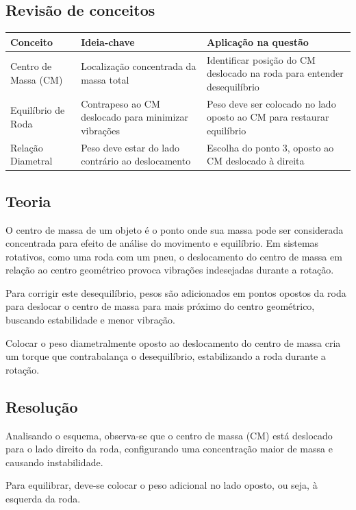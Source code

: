 \documentclass{article}
\begin{document}
\subsection*{Revisão de conceitos}
\begin{tabular}{|p{4cm}|p{5cm}|p{5cm}|}
\hline
\textbf{Conceito} & \textbf{Ideia-chave} & \textbf{Aplicação na questão} \\
\hline
Centro de Massa (CM) & Localização concentrada da massa total & Identificar posição do CM deslocado na roda para entender desequilíbrio \\
\hline
Equilíbrio de Roda & Contrapeso ao CM deslocado para minimizar vibrações & Peso deve ser colocado no lado oposto ao CM para restaurar equilíbrio \\
\hline
Relação Diametral & Peso deve estar do lado contrário ao deslocamento & Escolha do ponto 3, oposto ao CM deslocado à direita \\
\hline
\end{tabular}

\subsection*{Teoria}

O centro de massa de um objeto é o ponto onde sua massa pode ser considerada concentrada para efeito de análise do movimento e equilíbrio. Em sistemas rotativos, como uma roda com um pneu, o deslocamento do centro de massa em relação ao centro geométrico provoca vibrações indesejadas durante a rotação.

Para corrigir este desequilíbrio, pesos são adicionados em pontos opostos da roda para deslocar o centro de massa para mais próximo do centro geométrico, buscando estabilidade e menor vibração.

Colocar o peso diametralmente oposto ao deslocamento do centro de massa cria um torque que contrabalança o desequilíbrio, estabilizando a roda durante a rotação.

\subsection*{Resolução}

Analisando o esquema, observa-se que o centro de massa (CM) está deslocado para o lado direito da roda, configurando uma concentração maior de massa e causando instabilidade.

Para equilibrar, deve-se colocar o peso adicional no lado oposto, ou seja, à esquerda da roda.
\end{document}
